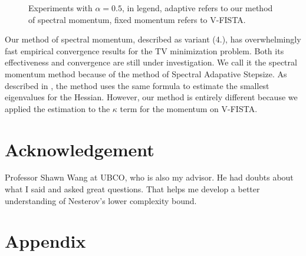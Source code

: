 \documentclass[]{article}
\theoremstyle{definition}
\numberwithin{equation}{subsection}
\begin{document}
\begin{figure}[H]
{            }
            \caption{Experiments with $\alpha = 0.5$, in legend, adaptive refers to our method of spectral momentum, fixed momentum refers to V-FISTA. }
            \label{fig:results2}
        \end{figure}
        Our method of spectral momentum, described as variant (4.), has overwhelmingly fast empirical convergence results for the TV minimization problem. 
        Both its effectiveness and convergence are still under investigation. 
        We call it the spectral momentum method because of the method of Spectral Adapative Stepsize. 
        As described in \cite[4.1]{goldstein_field_2016}, the method uses the same formula to estimate the smallest eigenvalues for the Hessian. 
        However, our method is entirely different because we applied the estimation to the $\kappa$ term for the momentum on V-FISTA. 

\section*{Acknowledgement}
    Professor Shawn Wang at UBCO, who is also my advisor. 
    He had doubts about what I said and asked great questions. 
    That helps me develop a better understanding of Nesterov's lower complexity bound. 

\pagebreak        
\appendix

\section{Appendix} 
    



\end{document}
